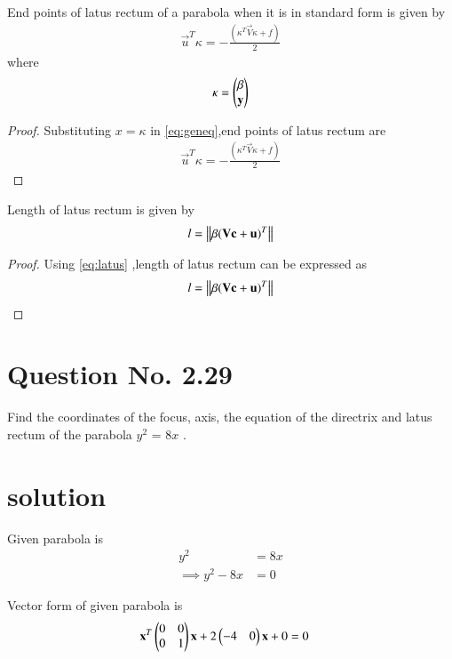 \documentclass[journal,12pt,twocolumn]{IEEEtran}
\begin{document}
\begin{lemma}
End points of latus rectum of a parabola when it is in standard form is given by
\begin{align}
\vec{u}^T\kappa = -\frac{(\kappa^T\vec{V}\kappa + f )}{2} \label{eq:endpt}
\end{align}
where
\begin{align}
\kappa = \begin{pmatrix}\beta \\ \mathbf{y}\end{pmatrix}
\end{align}
\end{lemma}

\begin{proof}
Substituting $x=\kappa$ in \eqref{eq:geneq},end points of latus rectum are
\begin{align}
\vec{u}^T\kappa = -\frac{(\kappa^T\vec{V}\kappa + f )}{2}
\end{align}
\end{proof}

\begin{lemma}
Length of latus rectum is given by 
\begin{align}
l=\left\lVert\beta(\mathbf{V}\mathbf{c}+\mathbf{u})^T\right\rVert \label{eq:length}
\end{align}
\end{lemma}

\begin{proof}
Using \eqref{eq:latus} ,length of latus rectum can be expressed as
\begin{align}
  l=\left\lVert\beta(\mathbf{V}\mathbf{c}+\mathbf{u})^T\right\rVert
\end{align}
\end{proof}

\clearpage
\section{Question No. 2.29}
Find the coordinates of the focus, axis, the equation of the directrix and latus rectum of the parabola $y^2$ = 8$x$ .
%
\section{solution}
Given parabola is 
\begin{align}
y^2 &= 8x
\\
\implies y^2 - 8x &= 0
\end{align}

Vector form of given parabola is
\begin{align}
\mathbf{x}^T\begin{pmatrix}0 & 0 \\ 0 & 1\end{pmatrix}\mathbf{x} + 2\begin{pmatrix}-4 & 0\end{pmatrix}\mathbf{x} + 0 &= 0 
\end{align}
\end{document}
